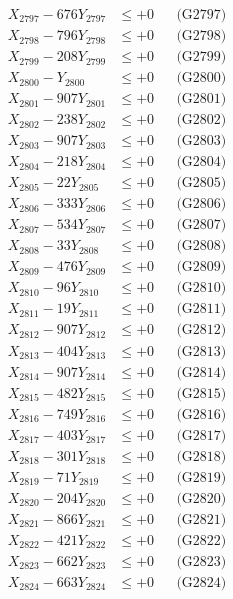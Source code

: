 \documentclass[a4paper,10pt]{article}
\begin{document}
{\begin{align}
X_{2797} - 676Y_{2797} &\leq +0 && \text{(G2797)} \\
X_{2798} - 796Y_{2798} &\leq +0 && \text{(G2798)} \\
X_{2799} - 208Y_{2799} &\leq +0 && \text{(G2799)} \\
X_{2800} - Y_{2800} &\leq +0 && \text{(G2800)} \\
\allowbreak
X_{2801} - 907Y_{2801} &\leq +0 && \text{(G2801)} \\
X_{2802} - 238Y_{2802} &\leq +0 && \text{(G2802)} \\
X_{2803} - 907Y_{2803} &\leq +0 && \text{(G2803)} \\
X_{2804} - 218Y_{2804} &\leq +0 && \text{(G2804)} \\
X_{2805} - 22Y_{2805} &\leq +0 && \text{(G2805)} \\
X_{2806} - 333Y_{2806} &\leq +0 && \text{(G2806)} \\
X_{2807} - 534Y_{2807} &\leq +0 && \text{(G2807)} \\
X_{2808} - 33Y_{2808} &\leq +0 && \text{(G2808)} \\
X_{2809} - 476Y_{2809} &\leq +0 && \text{(G2809)} \\
X_{2810} - 96Y_{2810} &\leq +0 && \text{(G2810)} \\
\allowbreak
X_{2811} - 19Y_{2811} &\leq +0 && \text{(G2811)} \\
X_{2812} - 907Y_{2812} &\leq +0 && \text{(G2812)} \\
X_{2813} - 404Y_{2813} &\leq +0 && \text{(G2813)} \\
X_{2814} - 907Y_{2814} &\leq +0 && \text{(G2814)} \\
X_{2815} - 482Y_{2815} &\leq +0 && \text{(G2815)} \\
X_{2816} - 749Y_{2816} &\leq +0 && \text{(G2816)} \\
X_{2817} - 403Y_{2817} &\leq +0 && \text{(G2817)} \\
X_{2818} - 301Y_{2818} &\leq +0 && \text{(G2818)} \\
X_{2819} - 71Y_{2819} &\leq +0 && \text{(G2819)} \\
X_{2820} - 204Y_{2820} &\leq +0 && \text{(G2820)} \\
\allowbreak
X_{2821} - 866Y_{2821} &\leq +0 && \text{(G2821)} \\
X_{2822} - 421Y_{2822} &\leq +0 && \text{(G2822)} \\
X_{2823} - 662Y_{2823} &\leq +0 && \text{(G2823)} \\
X_{2824} - 663Y_{2824} &\leq +0 && \text{(G2824)} \\

\end{align}}
\end{document}
